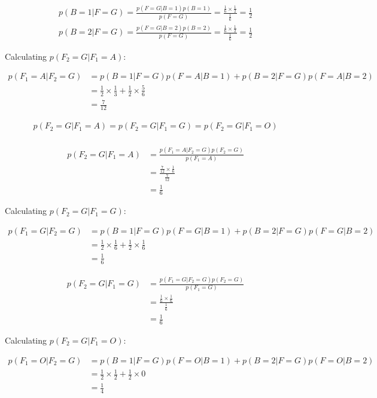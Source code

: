 \documentclass[a4paper]{article}
\begin{document}
\begin{align*}
	p(B = 1 | F = G) = \frac{p(F = G | B = 1)p(B = 1)}{p(F = G)} = \frac{\frac{1}{6} \times \frac{1}{2}}{\frac{1}{6}} = \frac{1}{2}\\
	p(B = 2 | F = G) = \frac{p(F = G | B = 2)p(B = 2)}{p(F = G)} = \frac{\frac{1}{6} \times \frac{1}{2}}{\frac{1}{6}} = \frac{1}{2}
\end{align*}

Calculating $p(F_2 = G | F_1 = A)$:

\begin{align*}
	p(F_1 = A | F_2 = G) &= p(B = 1| F = G)p(F = A | B = 1) + p(B = 2 | F = G)p(F = A | B = 2)\\
	&= \frac{1}{2} \times \frac{1}{3} +  \frac{1}{2} \times \frac{5}{6}\\
	&= \frac{7}{12}
\end{align*}


\begin{align*}
	p(F_2 = G | F_1 = A) = p(F_2 = G | F_1 = G) = p(F_2 = G | F_1 = O)\\
\end{align*}


\begin{align*}
	p(F_2 = G | F_1 = A) &= \frac{p(F_1 = A | F_2 = G)p(F_2 = G)}{p(F_1 = A)}\\
	&= \frac{\frac{7}{12} \times \frac{1}{6}}{\frac{7}{12}}\\
	&= \frac{1}{6}
\end{align*}


Calculating $p(F_2 = G | F_1 = G)$:

\begin{align*}
	p(F_1 = G | F_2 = G) &=  p(B = 1| F = G)p(F = G | B = 1) + p(B = 2 | F = G)p(F = G | B = 2)\\
	&= \frac{1}{2} \times \frac{1}{6} + \frac{1}{2} \times \frac{1}{6}\\
	&= \frac{1}{6}
\end{align*}

\begin{align*}
	p(F_2 = G | F_1 = G) &= \frac{p(F_1 = G | F_2 = G)p(F_2 = G)}{p(F_1 = G)}\\
	&= \frac{\frac{1}{6} \times \frac{1}{6}}{\frac{1}{6}}\\
	&= \frac{1}{6}
\end{align*}


Calculating $p(F_2 = G | F_1 = O)$:

\begin{align*}
	p(F_1 = O | F_2 = G) &= p(B = 1| F = G)p(F = O | B = 1) + p(B = 2 | F = G)p(F = O | B = 2)\\
	&= \frac{1}{2} \times \frac{1}{2} +  \frac{1}{2} \times 0\\
	&= \frac{1}{4}
\end{align*}
\end{document}
